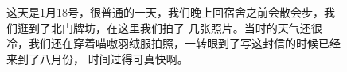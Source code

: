 \documentclass[cn,11pt,chinese]{elegantbook}
\begin{document}
\begin{figure}
    \caption{这天是1月18号，很普通的一天，我们晚上回宿舍之前会散会步，我们逛到了北门牌坊，在这里我们拍了
    几张照片。当时的天气还很冷，我们还在穿着喵嗷羽绒服拍照，一转眼到了写这封信的时候已经来到了八月份，
    时间过得可真快啊。}
\end{figure}
\end{document}
